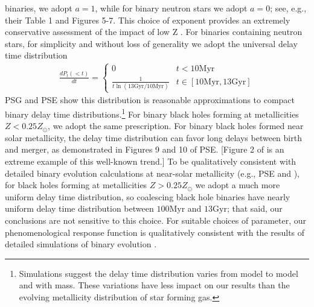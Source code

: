 \documentclass[nofootinbib,twocolumn,prd]{emulateapj}
\newcommand\unit[1]{\text{#1}}
\newcommand\abbrvPSgrb{PSG}
\newcommand\abbrvPSellipticals{PSE}
\begin{document}
binaries, we adopt $a=1$, while for binary neutron stars we adopt $a=0$; see, e.g., their Table 1 and Figures
5-7. This choice of exponent provides an extremely conservative assessment of the impact of low Z
\cite[see,e.g.,][]{2012CQGra..29n5011O,gwastro-EventPopsynPaper-2016}. 
%
For binaries containing neutron stars, for simplicity and without loss of generality we adopt the universal delay time distribution
\begin{eqnarray}
\frac{dP_t(<t)}{dt} =  \begin{cases}
0 & t<10 \unit{Myr} \\
\frac{1}{t \ln (13 \unit{Gyr}/10\unit{Myr})} & t \in [10\unit{Myr},13\unit{Gyr}]
\end{cases} 
\end{eqnarray}
\abbrvPSgrb{} and \abbrvPSellipticals{} show this distribution is reasonable approximations to compact binary delay
time distributions.\footnote{Simulations suggest the delay time distribution varies from model to model and with mass.
  These variations have less impact on our results than the evolving metallicity distribution of star forming gas.}
%
For binary black holes forming at metallicities $Z<0.25 Z_\odot$, we adopt the same prescription.  
For binary black holes formed near solar metallicity, the delay time distribution can favor long delays between birth
and merger, as demonstrated in Figures 9 and 10 of \abbrvPSellipticals{}.  [Figure 2 of  \cite{2016arXiv160508783L} is
  an extreme example of this well-known trend.] 
To be qualitatively consistent with detailed binary evolution calculations at near-solar metallicity (e.g., \abbrvPSellipticals{} and
\cite{gwastro-EventPopsynPaper-2016}), for 
black holes forming at metallicities $Z>0.25 Z_\odot$ we adopt a much more uniform delay time distribution, so 
coalescing black hole binaries have nearly uniform delay time distribution between $100\unit{Myr}$ and
$13\unit{Gyr}$; that said,  our conclusions are not sensitive to this choice.
%
For suitable choices of parameter, our phenomenological response function is qualitatively consistent with the results of detailed simulations of binary
evolution  \citep{2010ApJ...715L.138B,popsyn-LowMetallicityImpact2c-StarTrackRevised-2014,popsyn-LowMetallicityImpact2b-StarTrackRevised-2013,popsyn-LowMetallicityImpact2-StarTrackRevised-2012}.
\end{document}
